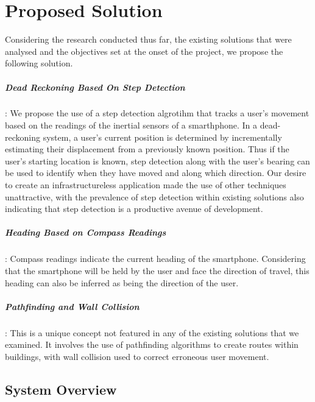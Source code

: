 \documentclass[12pt,a4paper]{report}
\begin{document}
\chapter{Proposed Solution}

Considering the research conducted thus far, the existing solutions that were analysed and the objectives set at the onset of the project, we propose the following solution.

\paragraph{Dead Reckoning Based On Step Detection}

: We propose the use of a step detection algrotihm that tracks a user's movement based on the readings of the inertial sensors of a smarthphone. In a dead-reckoning system, a user's current position is determined by incrementally estimating their displacement from a previously known position. Thus if the user's starting location is known, step detection along with the user's bearing can be used to identify when they have moved and along which direction. Our desire to create an infrastructureless application made the use of other techniques unattractive, with the prevalence of step detection within existing solutions also indicating that step detection is a productive avenue of development.

\paragraph{Heading Based on Compass Readings}

: Compass readings indicate the current heading of the smartphone. Considering that the smartphone will be held by the user and face the direction of travel, this heading can also be inferred as being the direction of the user.

\paragraph{Pathfinding and Wall Collision}
: This is a unique concept not featured in any of the existing solutions that we examined. It involves the use of pathfinding algorithms to create routes within buildings, with wall collision used to correct erroneous user movement. 

\section{System Overview}
\end{document}
